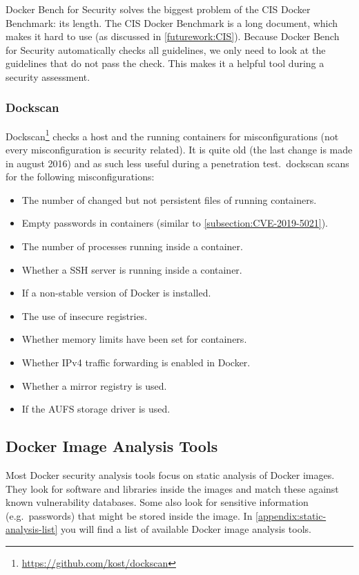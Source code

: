 \medskip

Docker Bench for Security solves the biggest problem of the CIS Docker Benchmark: its length. The CIS Docker Benchmark is a long document, which makes it hard to use (as discussed in \autoref{futurework:CIS}). Because Docker Bench for Security automatically checks all guidelines, we only need to look at the guidelines that do not pass the check. This makes it a helpful tool during a security assessment.

\subsubsection{Dockscan}
Dockscan\footnote{\url{https://github.com/kost/dockscan}} checks a host and the running containers for misconfigurations (not every misconfiguration is security related). It is quite old (the last change is made in august 2016) and as such less useful during a penetration test.\ dockscan scans for the following misconfigurations:
\begin{itemize}
    \item The number of changed but not persistent files of running containers.
    \item Empty passwords in containers (similar to \autoref{subsection:CVE-2019-5021}).
    \item The number of processes running inside a container.
    \item Whether a SSH server is running inside a container.
    \item If a non-stable version of Docker is installed.
    \item The use of insecure registries.
    \item Whether memory limits have been set for containers.
    \item Whether IPv4 traffic forwarding is enabled in Docker.
    \item Whether a mirror registry is used.
    \item If the AUFS storage driver is used.
\end{itemize}

\subsection{Docker Image Analysis Tools}\label{subsection:image-analysis-tools}
Most Docker security analysis tools focus on static analysis of Docker images. They look for software and libraries inside the images and match these against known vulnerability databases. Some also look for sensitive information (e.g.\ passwords) that might be stored inside the image. In \autoref{appendix:static-analysis-list} you will find a list of available Docker image analysis tools.

